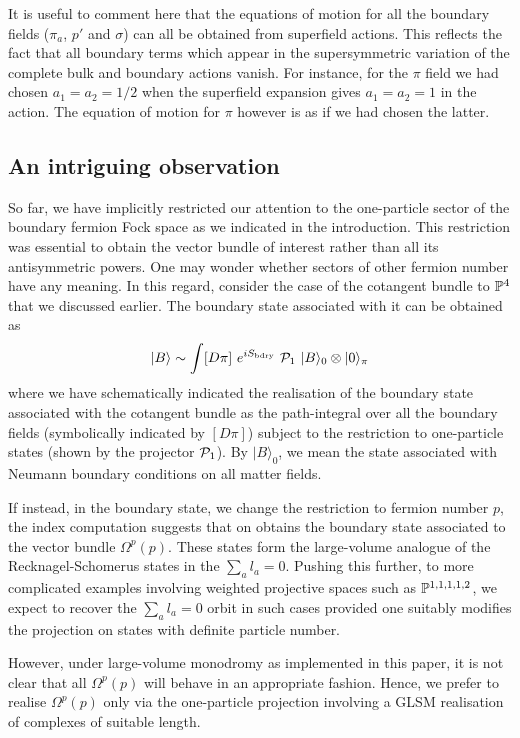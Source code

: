 \documentclass[a4paper,12pt]{article}
\begin{document}
It is useful to comment here that 
the equations of motion for all the boundary fields 
($\pi_a$, $p'$ and $\sigma$) can all be obtained from superfield
actions. This  reflects the fact that all boundary terms which
appear in the supersymmetric variation of the complete
bulk and boundary actions vanish.  For instance, for the $\pi$ field
we had chosen $a_1=a_2=1/2$ when the superfield expansion
gives $a_1=a_2=1$ in the action. The equation of motion for $\pi$
however is as if we had chosen the latter. 



\subsection{An intriguing observation}

So far, we have implicitly restricted our attention to  the one-particle
sector of the boundary fermion Fock space as we indicated in the
introduction. This restriction was essential to obtain the vector bundle
of interest rather than all its antisymmetric powers.   One may wonder
whether sectors of other fermion number have any meaning. In this
regard, consider the case of the  cotangent bundle to $\mathbb P^4$ that we
discussed earlier. The boundary state associated with it can be obtained
as
\begin{equation}
|B\rangle \sim \int [D\pi]\ e^{ iS_{\rm bdry}}\  {\cal P}_1\  |B\rangle_0
\otimes |0\rangle_\pi
\end{equation}
where we have schematically indicated the realisation of the boundary
state associated with the cotangent bundle as the path-integral
over all the boundary fields (symbolically indicated by $[D\pi]$)
subject to the restriction to one-particle
states (shown by the projector ${\cal P}_1$). By $|B\rangle_0$, we mean
the state associated with Neumann boundary conditions on all
matter fields. 

If instead, in the boundary state, we  change the
restriction to fermion number $p$, the index computation suggests that
on obtains the  boundary state associated to the vector bundle
$\Omega^p(p)$. These states form the large-volume analogue of
the Recknagel-Schomerus states in the $\sum_a l_a=0$. Pushing this
further, to more complicated examples involving weighted projective
spaces such as $\mathbb P^{1,1,1,1,2}$, we expect to  recover the $\sum_a l_a=0$
orbit in such cases provided one suitably modifies
the projection on states with definite particle number.

However, under large-volume monodromy as implemented in this paper, it
is not clear that all $\Omega^p(p)$ will behave in an appropriate
fashion.  Hence, we prefer to realise $\Omega^p(p)$ only via the
one-particle projection involving  a GLSM realisation of
complexes of suitable length.
\end{document}
